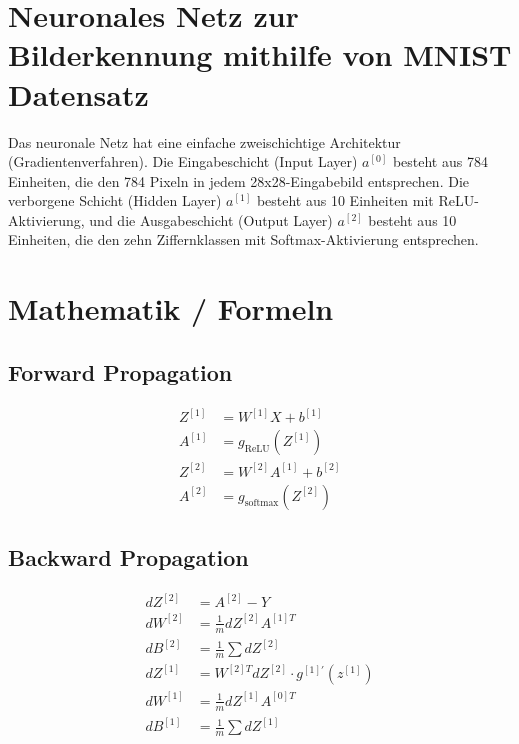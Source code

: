 \documentclass[10pt,a4paper]{article}
\newlength{\sectionparaspace}
\begin{document}

\section*{Neuronales Netz zur Bilderkennung mithilfe von MNIST Datensatz}
\vspace{-\sectionparaspace}
Das neuronale Netz hat eine einfache zweischichtige Architektur (Gradientenverfahren). Die Eingabeschicht (Input Layer) $a^{[0]}$ besteht aus 784 Einheiten, die den 784 Pixeln in jedem 28x28-Eingabebild entsprechen. Die verborgene Schicht (Hidden Layer) $a^{[1]}$ besteht aus 10 Einheiten mit ReLU-Aktivierung, und die Ausgabeschicht (Output Layer) $a^{[2]}$ besteht aus 10 Einheiten, die den zehn Ziffernklassen mit Softmax-Aktivierung entsprechen.
\vspace{-\sectionparaspace}
\section*{Mathematik / Formeln}

\vspace{-\sectionparaspace}

\subsection*{Forward Propagation}
\begin{align*}
Z^{[1]} &= W^{[1]} X + b^{[1]} \\
A^{[1]} &= g_{\text{ReLU}}(Z^{[1]}) \\
Z^{[2]} &= W^{[2]} A^{[1]} + b^{[2]} \\
A^{[2]} &= g_{\text{softmax}}(Z^{[2]})
\end{align*}

\subsection*{Backward Propagation}
\begin{align*}
dZ^{[2]} &= A^{[2]} - Y \\
dW^{[2]} &= \frac{1}{m} dZ^{[2]} A^{[1]T} \\
dB^{[2]} &= \frac{1}{m} \sum dZ^{[2]} \\
dZ^{[1]} &= W^{[2]T} dZ^{[2]} \cdot g^{[1]\prime}(z^{[1]}) \\
dW^{[1]} &= \frac{1}{m} dZ^{[1]} A^{[0]T} \\
dB^{[1]} &= \frac{1}{m} \sum dZ^{[1]}
\end{align*}
\end{document}
